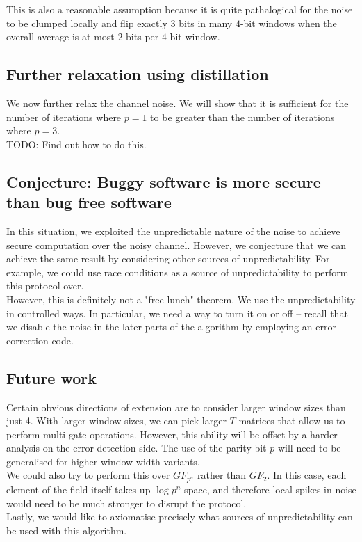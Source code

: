 \documentclass[11pt]{article}
\begin{document}
This is also a reasonable assumption because it is quite pathalogical for the noise to be clumped locally and flip exactly $3$ bits in many $4$-bit windows when the overall average is at most $2$ bits per $4$-bit window.

\subsection{Further relaxation using distillation}
We now further relax the channel noise. We will show that it is sufficient for the number of iterations where $p = 1$ to be greater than the number of iterations where $p = 3$.\\

TODO: Find out how to do this.

\subsection{Conjecture: Buggy software is more secure than bug free software}

In this situation, we exploited the unpredictable nature of the noise to achieve secure computation over the noisy channel. However, we conjecture that we can achieve the same result by considering other sources of unpredictability. For example, we could use race conditions as a source of unpredictability to perform this protocol over. \\

However, this is definitely not a "free lunch" theorem. We use the unpredictability in controlled ways. In particular, we need a way to turn it on or off -- recall that we disable the noise in the later parts of the algorithm by employing an error correction code.

\subsection{Future work}
Certain obvious directions of extension are to consider larger window sizes than just 4. With larger window sizes, we can pick larger $T$ matrices that allow us to perform multi-gate operations. However, this ability will be offset by a harder analysis on the error-detection side. The use of the parity bit $p$ will need to be generalised for higher window width variants. \\

We could also try to perform this over $GF_{p^n}$ rather than $GF_{2}$. In this case, each element of the field itself takes up $\log p^n$ space, and therefore local spikes in noise would need to be much stronger to disrupt the protocol. \\

Lastly, we would like to axiomatise precisely what sources of unpredictability can be used with this algorithm.
\end{document}
